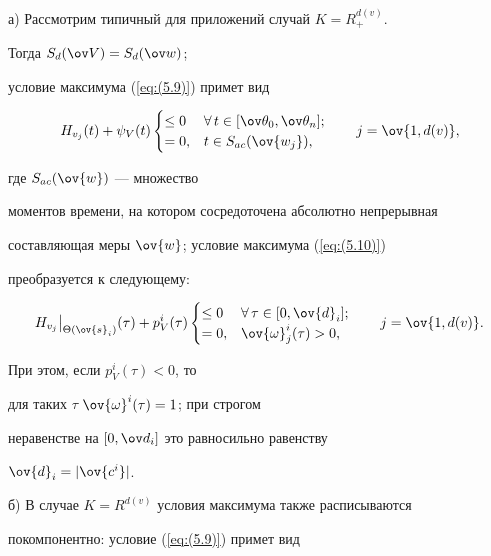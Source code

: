 \medskip





а) Рассмотрим типичный для приложений случай $K=R_{+}^{d(v)}$.


Тогда $S_d(\ov V)=S_d(\ov w)$;


условие максимума (\ref{eq:(5.9)}) примет вид


$$


{H}_{v_j}(t)+\psi_V(t)


\begin{cases}


\leq 0 & \forall \, t\in [\ov\theta_0,\ov\theta_n]; \\


=0, & t\in S_{ac}(\ov{ w_j}),


\end{cases}


\qquad j=\ov{1,d(v)},


$$


где $S_{ac}(\ov{ w})$ --- множество


моментов времени, на котором сосредоточена абсолютно непрерывная


составляющая меры $\ov{ w}$; условие максимума (\ref{eq:(5.10)})


преобразуется к следующему:


$$


{H}_{v_j} \big|_{


\Theta(\ov{s}_i)}(\tau)+p_V^i(\tau)


\begin{cases}


\leq 0 & \forall \, \tau\in [0,\ov{d}_i]; \\


=0, & \ov{\omega}^i_j(\tau)>0,


\end{cases}\qquad j=\ov{1,d(v)}.


$$


При этом, если $p_V^i(\tau)<0$, то


для таких $\tau$ $\ov{\omega}^i(\tau)=1$; при строгом


неравенстве на $[0,\ov d_i]$ это равносильно равенству


$\ov{d}_i=|\ov{c^i}|$.





б) В случае $K=R^{d(v)}$ условия максимума также расписываются


покомпонентно: условие (\ref{eq:(5.9)}) примет вид


